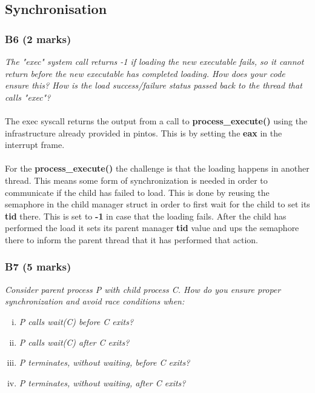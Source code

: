 \documentclass{report}
\newcommand{\question}[1]{\textit{#1} \ }
\newcommand{\fun}[1]{\textcolor{Emerald}{\textbf{#1}}}
\newcommand{\var}[1]{\textcolor{RoyalPurple}{\textbf{#1}}}
\newcommand{\const}[1]{\textcolor{BrickRed}{\textbf{#1}}}
\begin{document}
        \subsection*{Synchronisation}
            \subsubsection*{B6 (2 marks)}
                \question{The "exec" system call returns -1 if loading the new executable fails, so it cannot return before the new 
                executable has completed loading. How does your code ensure this? How is the load success/failure status passed back to 
                the thread that calls "exec"?} 
									\\ 
									\\ The exec syscall returns the output from a call to \fun{process\_execute()} using the infrastructure already provided in pintos. This is by
                                    setting the \var{eax} in the interrupt frame. 
                                    \\ 
                                    \\ For the \fun{process\_execute()} the challenge is that the loading happens in another thread. This means some form of synchronization is needed
                                    in order to communicate if the child has failed to load. This is done by reusing the semaphore in the child manager struct in order to first wait
                                    for the child to set its \var{tid} there. This is set to \const{-1} in case that the loading fails. After the child has performed the load it sets its parent manager \var{tid} value
                                    and ups the semaphore there to inform the parent thread that it has performed that action.

            \subsubsection*{B7 (5 marks)}
                \question{Consider parent process P with child process C. How do you ensure proper synchronization and avoid race conditions when:}

                \begin{enumerate}[(i)]
                  \item \question{P calls wait(C) before C exits?}
                  \item \question{P calls wait(C) after C exits?}
                  \item \question{P terminates, without waiting, before C exits?}
                  \item \question{P terminates, without waiting, after C exits?}
                \end{enumerate}
\end{document}
